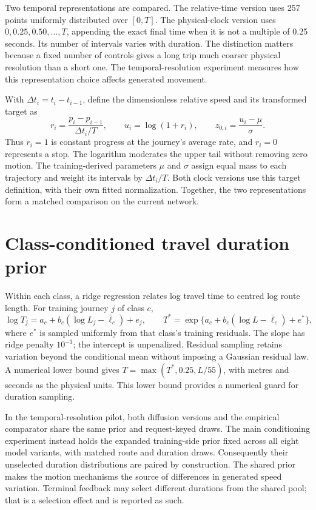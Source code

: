 Two temporal representations are compared. The relative-time version uses 257 points uniformly distributed over $[0,T]$. The physical-clock version uses $0,0.25,0.50,\ldots,T$, appending the exact final time when it is not a multiple of 0.25 seconds. Its number of intervals varies with duration. The distinction matters because a fixed number of controls gives a long trip much coarser physical resolution than a short one. The temporal-resolution experiment measures how this representation choice affects generated movement.

With $\Delta t_i=t_i-t_{i-1}$, define the dimensionless relative speed and its transformed target as
\begin{equation}
 r_i=\frac{p_i-p_{i-1}}{\Delta t_i/T},\qquad
 u_i=\log(1+r_i),\qquad z_{0,i}=\frac{u_i-\mu}{\sigma}.
 \label{eq:native-target}
\end{equation}
Thus $r_i=1$ is constant progress at the journey's average rate, and $r_i=0$ represents a stop. The logarithm moderates the upper tail without removing zero motion. The training-derived parameters $\mu$ and $\sigma$ assign equal mass to each trajectory and weight its intervals by $\Delta t_i/T$. Both clock versions use this target definition, with their own fitted normalization. Together, the two representations form a matched comparison on the current network.

\section{Class-conditioned travel duration prior}
Within each class, a ridge regression relates log travel time to centred log route length. For training journey $j$ of class $c$,
\begin{equation}
 \log T_j=a_c+b_c(\log L_j-\bar\ell_c)+e_j,
 \qquad
 T^*=\exp\{a_c+b_c(\log L-\bar\ell_c)+e^*\},
 \label{eq:native-duration}
\end{equation}
where $e^*$ is sampled uniformly from that class's training residuals. The slope has ridge penalty $10^{-3}$; the intercept is unpenalized. Residual sampling retains variation beyond the conditional mean without imposing a Gaussian residual law. A numerical lower bound gives $T=\max(T^*,0.25,L/55)$, with metres and seconds as the physical units. This lower bound provides a numerical guard for duration sampling.

In the temporal-resolution pilot, both diffusion versions and the empirical comparator share the same prior and request-keyed draws. The main conditioning experiment instead holds the expanded training-side prior fixed across all eight model variants, with matched route and duration draws. Consequently their unselected duration distributions are paired by construction. The shared prior makes the motion mechanisms the source of differences in generated speed variation. Terminal feedback may select different durations from the shared pool; that is a selection effect and is reported as such.

